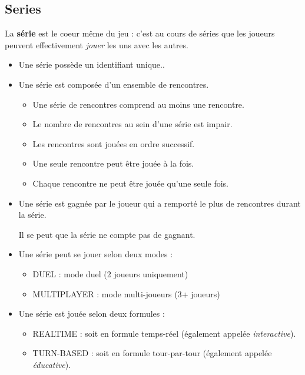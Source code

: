 \subsection{Series}
La \textbf{série} est le coeur même du jeu : c'est au cours de séries que les joueurs peuvent effectivement \textit{jouer} les uns avec les autres.
    \begin{itemize}
        \item Une série possède un identifiant unique..
        \item Une série est composée d'un ensemble de rencontres.
            \begin{itemize}
                \item Une série de rencontres comprend au moins une rencontre.
                \item Le nombre de rencontres au sein d'une série est impair.
                \item Les rencontres sont jouées en ordre successif.
                \item Une seule rencontre peut être jouée à la fois.
                \item Chaque rencontre ne peut être jouée qu'une seule fois.
            \end{itemize} 
        \item Une série est gagnée par le joueur qui a remporté le plus de rencontres durant la série. 
            \begin{tcolorbox}
                Il se peut que la série ne compte pas de gagnant.
            \end{tcolorbox}
        \item Une série peut se jouer selon deux modes :
            \begin{itemize}
                \item DUEL :        mode duel (2 joueurs uniquement)
                \item MULTIPLAYER : mode multi-joueurs (3+ joueurs)
            \end{itemize}
        \item Une série est jouée selon deux formules :
            \begin{itemize}
                \item REALTIME :   soit en formule temps-réel (également appelée \textit{interactive}).
                \item TURN-BASED : soit en formule tour-par-tour (également appelée \textit{éducative}).
            \end{itemize}

\end{itemize}
